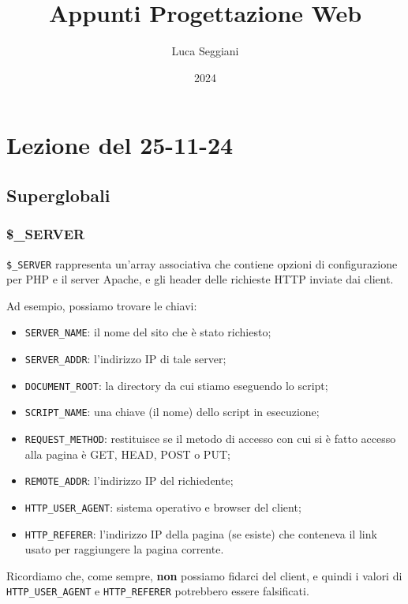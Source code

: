 \documentclass[a4paper,11pt]{article}
\title{Appunti Progettazione Web}
\author{Luca Seggiani}
\date{2024}
\begin{document}
\section{Lezione del 25-11-24}

\thispagestyle{empty}
\pagestyle{fancy}

\lstset{style=codestyle, language=php}

\TODO %

\subsection{Superglobali}

\subsubsection{\$\_SERVER}

\lstinline|$_SERVER| rappresenta un'array associativa che contiene opzioni di configurazione per PHP e il server Apache, e gli header delle richieste HTTP inviate dai client.

Ad esempio, possiamo trovare le chiavi:
\begin{itemize}
	\item \lstinline|SERVER_NAME|: il nome del sito che è stato richiesto; 
	\item \lstinline|SERVER_ADDR|: l'indirizzo IP di tale server; 
	\item \lstinline|DOCUMENT_ROOT|: la directory da cui stiamo eseguendo lo script; 
	\item \lstinline|SCRIPT_NAME|: una chiave (il nome) dello script in esecuzione;
	\item \lstinline|REQUEST_METHOD|: restituisce se il metodo di accesso con cui si è fatto accesso alla pagina è GET, HEAD, POST o PUT;
	\item \lstinline|REMOTE_ADDR|: l'indirizzo IP del richiedente; 
	\item \lstinline|HTTP_USER_AGENT|: sistema operativo e browser del client; 
	\item \lstinline|HTTP_REFERER|: l'indirizzo IP della pagina (se esiste) che conteneva il link usato per raggiungere la pagina corrente.
\end{itemize}

Ricordiamo che, come sempre, \textbf{non} possiamo fidarci del client, e quindi i valori di \lstinline|HTTP_USER_AGENT| e \lstinline|HTTP_REFERER| potrebbero essere falsificati.
\end{document}
